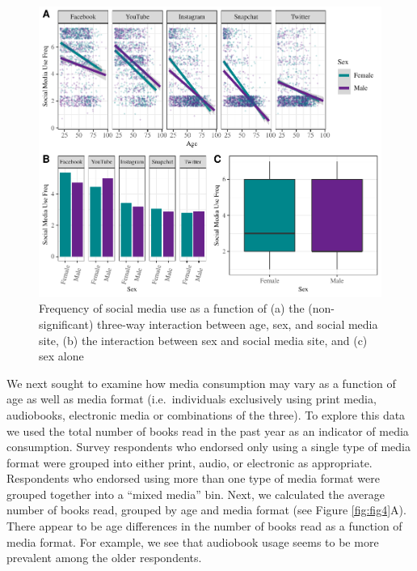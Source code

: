 \documentclass[man, fleqn, noextraspace]{apa6}
\theoremstyle{definition}
\theoremstyle{definition}
\theoremstyle{definition}
\theoremstyle{remark}
\begin{document}
\begin{figure}
\centering
\includegraphics{final_manuscript_files/figure-latex/fig2-1.pdf}
\caption{\label{fig:fig2}Frequency of social media use as a function of (a)
the (non-significant) three-way interaction between age, sex, and social
media site, (b) the interaction between sex and social media site, and
(c) sex alone}
\end{figure}

We next sought to examine how media consumption may vary as a function
of age as well as media format (i.e.~individuals exclusively using print
media, audiobooks, electronic media or combinations of the three). To
explore this data we used the total number of books read in the past
year as an indicator of media consumption. Survey respondents who
endorsed only using a single type of media format were grouped into
either print, audio, or electronic as appropriate. Respondents who
endorsed using more than one type of media format were grouped together
into a \enquote{mixed media} bin. Next, we calculated the average number
of books read, grouped by age and media format (see Figure
\ref{fig:fig4}A). There appear to be age differences in the number of
books read as a function of media format. For example, we see that
audiobook usage seems to be more prevalent among the older respondents.
\end{document}
